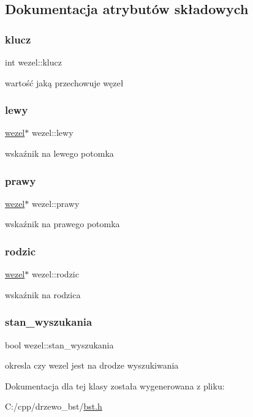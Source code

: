 \subsection{Dokumentacja atrybutów składowych}
\mbox{\label{classwezel_a974b7f21addfce76b123aa07ee0287c1}} 
\subsubsection{\texorpdfstring{klucz}{klucz}}
{\footnotesize\ttfamily int wezel\+::klucz}

wartość jaką przechowuje węzeł \mbox{\label{classwezel_a5ac913d2c2d91515dde416dfa9254a12}} 
\subsubsection{\texorpdfstring{lewy}{lewy}}
{\footnotesize\ttfamily \mbox{\hyperlink{classwezel}{wezel}}$\ast$ wezel\+::lewy}

wskaźnik na lewego potomka \mbox{\label{classwezel_ae890c73ae84fb0097a715d739fad9ea0}} 
\subsubsection{\texorpdfstring{prawy}{prawy}}
{\footnotesize\ttfamily \mbox{\hyperlink{classwezel}{wezel}}$\ast$ wezel\+::prawy}

wskaźnik na prawego potomka \mbox{\label{classwezel_a580c686473d5fa801cd15496f61da7f7}} 
\subsubsection{\texorpdfstring{rodzic}{rodzic}}
{\footnotesize\ttfamily \mbox{\hyperlink{classwezel}{wezel}}$\ast$ wezel\+::rodzic}

wskaźnik na rodzica \mbox{\label{classwezel_a24d936575a56379d5cebe8f45ef049f1}} 
\subsubsection{\texorpdfstring{stan\+\_\+wyszukania}{stan\_wyszukania}}
{\footnotesize\ttfamily bool wezel\+::stan\+\_\+wyszukania}

okresla czy wezel jest na drodze wyszukiwania 

Dokumentacja dla tej klasy została wygenerowana z pliku\+:\begin{DoxyCompactItemize}
\item 
C\+:/cpp/drzewo\+\_\+bst/\mbox{\hyperlink{bst_8h}{bst.\+h}}\end{DoxyCompactItemize}
